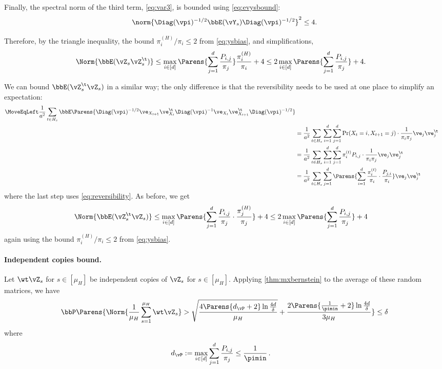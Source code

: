 Finally, the spectral norm of the third term, \cref{eq:var3}, is
bounded using \cref{eq:evysbound}:
\[
  \norm{\Diag(\vpi)^{-1/2} \bbE(\vY_s) \Diag(\vpi)^{-1/2}}^2
  \leq 4
  .
\]

Therefore, by the triangle inequality, the bound $\pi_i^{(H)}/\pi_i
\leq 2$ from \cref{eq:ysbias}, and simplifications, 
\begin{align*}
  \Norm{
    \bbE(\vZ_s \vZ_s^\t)
  }
  &\leq
  \max_{i\in[d]}
  \Parens{ \sum_{j=1}^d \frac{P_{i,j}}{\pi_j} }
  \frac{\pi_i^{(H)}}{\pi_i}
  + 4
  \leq
  2\max_{i\in[d]}
  \Parens{ \sum_{j=1}^d \frac{P_{i,j}}{\pi_j} }
  + 4
  .
\end{align*}

We can bound $\bbE(\vZ_s^\t \vZ_s)$
in a similar way; the only difference is that the reversibility needs
to be used at one place to simplify an expectation:
\begin{align*}
\MoveEqLeft
    \frac1{a^2} \sum_{t \in H_s}
    \bbE\Parens{
      \Diag(\vpi)^{-1/2}
      \ve_{X_{t+1}} \ve_{X_t}^\t
      \Diag(\vpi)^{-1}
      \ve_{X_t}\ve_{X_{t+1}}^\t
      \Diag(\vpi)^{-1/2}
    }
	\\
  & =
  \frac1{a^2} \sum_{t \in H_s}
  \sum_{i=1}^d \sum_{j=1}^d \Pr(X_t = i, X_{t+1} = j) \cdot
  \frac{1}{\pi_i\pi_j} \ve_j\ve_j^\t
  \\
  & =
  \frac1{a^2} \sum_{t \in H_s}
  \sum_{i=1}^d \sum_{j=1}^d \pi_i^{(t)} P_{i,j} \cdot
  \frac{1}{\pi_i\pi_j} \ve_j\ve_j^\t
  \\
  & =
  \frac1{a^2} \sum_{t \in H_s}
  \sum_{j=1}^d \Parens{
    \sum_{i=1}^d \frac{\pi_i^{(t)}}{\pi_i} \cdot \frac{P_{j,i}}{\pi_i}
  } \ve_j\ve_j^\t
\end{align*}
where the last step uses \cref{eq:reversibility}.
As before, we get
\begin{align*}
  \Norm{
    \bbE(\vZ_s^\t\vZ_s)
  }
  &\leq
  \max_{i\in[d]}
  \Parens{
    \sum_{j=1}^d \frac{P_{i,j}}{\pi_j}
    \cdot \frac{\pi_j^{(H)}}{\pi_j}
  }
  + 4
  \leq
  2 \max_{i\in[d]}
  \Parens{
    \sum_{j=1}^d \frac{P_{i,j}}{\pi_j}
  }
  + 4
\end{align*}
again using the bound $\pi_i^{(H)}/\pi_i \leq 2$ from
\cref{eq:ysbias}.

\paragraph{Independent copies bound.}
Let $\wt\vZ_s$ for $s \in [\mu_H]$ be independent copies of
$\vZ_s$ for $s \in [\mu_H]$.
Applying \cref{thm:mxbernstein} to the average of these random
matrices, we have
\begin{equation}
  \bbP\Parens{
    \Norm{ \frac1{\mu_H} \sum_{s=1}^{\mu_H} \wt\vZ_s}
    >
    \sqrt{
      \frac{4\Parens{ d_{\vP} + 2 } \ln\frac{4d}{\delta}}
      {\mu_H}
    }
    + \frac{2\Parens{ \frac1{\pimin} + 2 } \ln\frac{4d}{\delta}}
    {3\mu_H}
  } \leq \delta
  \label{eq:indpt-bound}
\end{equation}
where
\begin{align*}
  d_{\vP}
  & := \max_{i \in [d]} \sum_{j=1}^d \frac{P_{i,j}}{\pi_j}
  \leq
  \frac{1}{\pimin}
  \,.
\end{align*}

